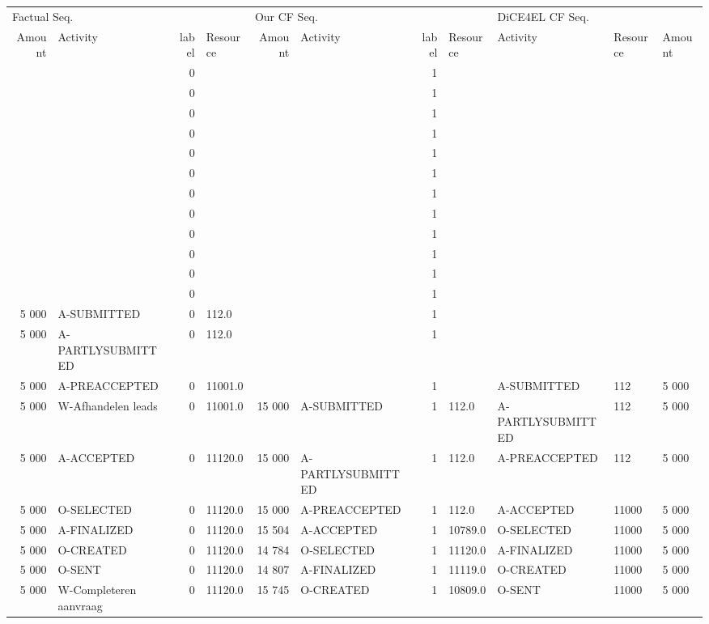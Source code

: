 \begin{tabular}{rlrlrlrllll}
\toprule
\multicolumn{4}{l}{Factual Seq.} & \multicolumn{4}{l}{Our CF Seq.} & \multicolumn{3}{l}{DiCE4EL CF Seq.} \\
Amount & Activity & label & Resource & Amount & Activity & label & Resource & Activity & Resource & Amount \\
\midrule
 &  & 0 &  &  &  & 1 &  &  &  &  \\
 &  & 0 &  &  &  & 1 &  &  &  &  \\
 &  & 0 &  &  &  & 1 &  &  &  &  \\
 &  & 0 &  &  &  & 1 &  &  &  &  \\
 &  & 0 &  &  &  & 1 &  &  &  &  \\
 &  & 0 &  &  &  & 1 &  &  &  &  \\
 &  & 0 &  &  &  & 1 &  &  &  &  \\
 &  & 0 &  &  &  & 1 &  &  &  &  \\
 &  & 0 &  &  &  & 1 &  &  &  &  \\
 &  & 0 &  &  &  & 1 &  &  &  &  \\
 &  & 0 &  &  &  & 1 &  &  &  &  \\
 &  & 0 &  &  &  & 1 &  &  &  &  \\
5 000 & A-SUBMITTED & 0 & 112.0 &  &  & 1 &  &  &  &  \\
5 000 & A-PARTLYSUBMITTED & 0 & 112.0 &  &  & 1 &  &  &  &  \\
5 000 & A-PREACCEPTED & 0 & 11001.0 &  &  & 1 &  & A-SUBMITTED & 112 & 5 000 \\
5 000 & W-Afhandelen leads & 0 & 11001.0 & 15 000 & A-SUBMITTED & 1 & 112.0 & A-PARTLYSUBMITTED & 112 & 5 000 \\
5 000 & A-ACCEPTED & 0 & 11120.0 & 15 000 & A-PARTLYSUBMITTED & 1 & 112.0 & A-PREACCEPTED & 112 & 5 000 \\
5 000 & O-SELECTED & 0 & 11120.0 & 15 000 & A-PREACCEPTED & 1 & 112.0 & A-ACCEPTED & 11000 & 5 000 \\
5 000 & A-FINALIZED & 0 & 11120.0 & 15 504 & A-ACCEPTED & 1 & 10789.0 & O-SELECTED & 11000 & 5 000 \\
5 000 & O-CREATED & 0 & 11120.0 & 14 784 & O-SELECTED & 1 & 11120.0 & A-FINALIZED & 11000 & 5 000 \\
5 000 & O-SENT & 0 & 11120.0 & 14 807 & A-FINALIZED & 1 & 11119.0 & O-CREATED & 11000 & 5 000 \\
5 000 & W-Completeren aanvraag & 0 & 11120.0 & 15 745 & O-CREATED & 1 & 10809.0 & O-SENT & 11000 & 5 000 \\

\end{tabular}
